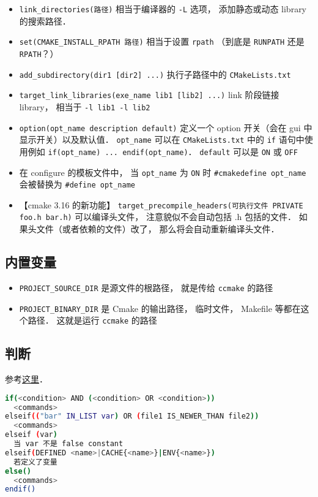 \begin{itemize}
\item \verb|link_directories(路径)| 相当于编译器的 \verb`-L` 选项， 添加静态或动态 library 的搜索路径．
\item \verb|set(CMAKE_INSTALL_RPATH 路径)| 相当于设置 \verb|rpath| （到底是 \verb|RUNPATH| 还是 \verb|RPATH|？）
\item \verb`add_subdirectory(dir1 [dir2] ...)` 执行子路径中的 \verb|CMakeLists.txt|
\item \verb`target_link_libraries(exe_name lib1 [lib2] ...)` link 阶段链接 library， 相当于 \verb|-l lib1 -l lib2|
\item \verb`option(opt_name description default)` 定义一个 option 开关（会在 gui 中显示开关）以及默认值． \verb`opt_name` 可以在 \verb|CMakeLists.txt| 中的 \verb`if` 语句中使用例如 \verb`if(opt_name) ... endif(opt_name)`． \verb`default` 可以是 \verb`ON` 或 \verb`OFF`
\item 在 configure 的模板文件中， 当 \verb`opt_name` 为 \verb`ON` 时 \verb`#cmakedefine opt_name` 会被替换为 \verb`#define opt_name`
\item 【cmake 3.16 的新功能】 \verb|target_precompile_headers(可执行文件 PRIVATE foo.h bar.h)| 可以编译头文件， 注意貌似不会自动包括 .h 包括的文件． 如果头文件（或者依赖的文件）改了， 那么将会自动重新编译头文件．
\end{itemize}

\subsection{内置变量}
\begin{itemize}
\item \verb`PROJECT_SOURCE_DIR` 是源文件的根路径， 就是传给 \verb`ccmake` 的路径
\item \verb`PROJECT_BINARY_DIR` 是 Cmake 的输出路径， 临时文件， Makefile 等都在这个路径． 这就是运行 \verb`ccmake` 的路径
\end{itemize}

\subsection{判断}
参考\href{https://cmake.org/cmake/help/latest/command/if.html}{这里}．
\begin{lstlisting}[language=bash]
if(<condition> AND (<condition> OR <condition>))
  <commands>
elseif(("bar" IN_LIST var) OR (file1 IS_NEWER_THAN file2))
  <commands>
elseif (var)
  当 var 不是 false constant
elseif(DEFINED <name>|CACHE{<name>}|ENV{<name>})
  若定义了变量
else()
  <commands>
endif()
\end{lstlisting}

